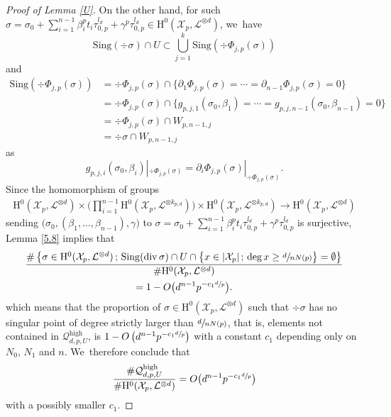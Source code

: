 \documentclass[11pt]{article}
\numberwithin{equation}{section}
\newcommand{\sep}{\,;\,}
\theoremstyle{plain}
\theoremstyle{definition}
\newcommand{\ho}{\mathrm{H}}
\newcommand{\X}{\mathcal{X}}
\newcommand{\li}{\mathcal{L}}
\begin{document}
\begin{proof}[Proof of Lemma \ref{U}]
On the other hand, for such $\sigma=\sigma_0+\sum_{i=1}^{n-1} \beta_i^pt_i\tau_{0,p}^{l_d}+\gamma^p\tau_{0,p}^{l_d}\in \ho^0(\X_p,\mathcal{L}^{\otimes d})$, we~have
\[
\mathrm{Sing}(\div \sigma)\cap U \subset \bigcup_{j=1}^k \mathrm{Sing}(\div \Phi_{j,p}(\sigma))
\]
and
\begin{align*}
\mathrm{Sing}(\div \Phi_{j,p}(\sigma))
&= \div \Phi_{j,p}(\sigma)\cap \{ \partial_1\Phi_{j,p}(\sigma)=\cdots =\partial_{n-1}\Phi_{j,p}(\sigma)=0 \} \\
&= \div \Phi_{j,p}(\sigma)\cap \{ g_{p,j,1}(\sigma_0,\beta_1)=\cdots = g_{p,j,n-1}(\sigma_0,\beta_{n-1})=0 \} \\
&= \div \Phi_{j,p}(\sigma)\cap W_{p,n-1,j} \\
&= \div \sigma\cap W_{p,n-1,j}
\end{align*}
as
\[
g_{p,j,i}(\sigma_0,\beta_i)|_{ \div \Phi_{j,p}(\sigma)}=\partial_i\Phi_{j,p}(\sigma)|_{ \div \Phi_{j,p}(\sigma)}.
\]
Since the homomorphism of groups
\begin{align*}
\ho^0(\X_p,\mathcal{L}^{\otimes d})\times \biggl(\prod_{i=1}^{n-1} \ho^0(\X_p,\mathcal{L}^{\otimes k_{p,d}}) \biggr) \times \ho^0(\X_p, \mathcal{L}^{\otimes k_{p,d}}) \to \ho^0(\X_p, \mathcal{L}^{\otimes d})
\end{align*}
sending $\big(\sigma_0, (\beta_1,\dots, \beta_{n-1}), \gamma\big)$ to $\sigma=\sigma_0+\sum_{i=1}^{n-1} \beta_i^pt_i\tau_{0,p}^{l_d}+\gamma^p\tau_{0,p}^{l_d}$ is surjective, Lemma \ref{5.8} implies that
\begin{multline*}
\frac{\#\left\{\sigma\in \ho^0(\X_p, \mathcal{L}^{\otimes d})\sep \mathrm{Sing}(\div \sigma)\cap U\cap \big\{ x\in |\X_p|\sep \deg x\geq\sfrac{d}{nN(p)} \big\}=\emptyset \right\}}{\# \ho^0(\X_p, \mathcal{L}^{\otimes d})}\\
= 1-O\bigl(d^{n-1}p^{-c_1\sfrac{d}{p}} \bigr).
\end{multline*}
which means that the proportion of $\sigma\in \ho^0(\X_p, \li^{\otimes d})$ such that $\div \sigma$ has no singular point of degree strictly larger than $\sfrac{d}{nN(p)}$, that is, elements not contained in $\mathcal{Q}_{d,p,U}^{\mathrm{high}}$, is $1-O\left(d^{n-1}p^{-c_1\sfrac{d}{p}} \right)$ with a constant $c_1$ depending only on $N_0$, $N_1$ and $n$. We~therefore conclude that
\[
\frac{\#\mathcal{Q}_{d,p,U}^{\mathrm{high}}}{\#\ho^0(\X_p, \li^{\otimes d})}=O\bigl(d^{n-1}p^{-c_1\sfrac{d}{p}}\bigr)
\]
with a possibly smaller $c_1$. 


\end{proof}
\end{document}
